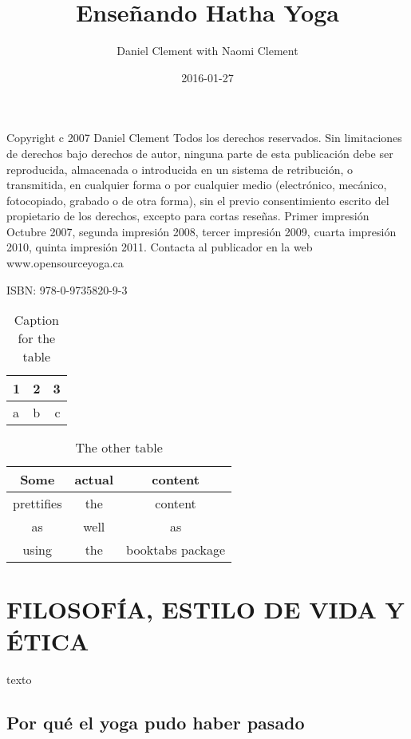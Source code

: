 \documentclass[a4paper]{article}
\title{Enseñando Hatha Yoga}
\date{2016-01-27}
\author{Daniel Clement with Naomi Clement}
\begin{document}
\maketitle

\newpage
Copyright c 2007 Daniel Clement
Todos los derechos reservados. Sin limitaciones de derechos bajo 
derechos de autor, ninguna parte de esta publicación debe ser 
reproducida, almacenada o introducida en un sistema de 
retribución, o transmitida, en cualquier forma o por cualquier 
medio (electrónico, mecánico, fotocopiado, grabado o de otra 
forma), sin el previo consentimiento escrito del propietario de 
los derechos, excepto para cortas reseñas.
Primer impresión Octubre 2007, segunda impresión 2008, tercer 
impresión 2009, cuarta impresión 2010, quinta impresión 2011.
Contacta al publicador en la web www.opensourceyoga.ca

ISBN: 978-0-9735820-9-3

\newpage
\tableofcontents
\newpage


\begin{table}[h!]
	\centering
	\begin{tabular}{l|c||r}
		1 & 2 & 3\\
		\hline
		a & b & c\\
	\end{tabular}
	\caption{Caption for the table}
	\label{tab:table}
\end{table}


\begin{table}[h!]
	\centering
	\begin{tabular}{ccc}
		\toprule
		Some & actual & content\\
		\midrule
		prettifies & the & content\\
		as & well & as \\
		using & the & booktabs package\\
		\bottomrule
	\end{tabular}
	\caption{The other table}
	\label{tab:table2}
\end{table}

\section{FILOSOF\'{I}A, ESTILO DE VIDA Y \'{E}TICA}
texto
\subsection{Por qu\'{e} el yoga pudo haber pasado}
\end{document}
